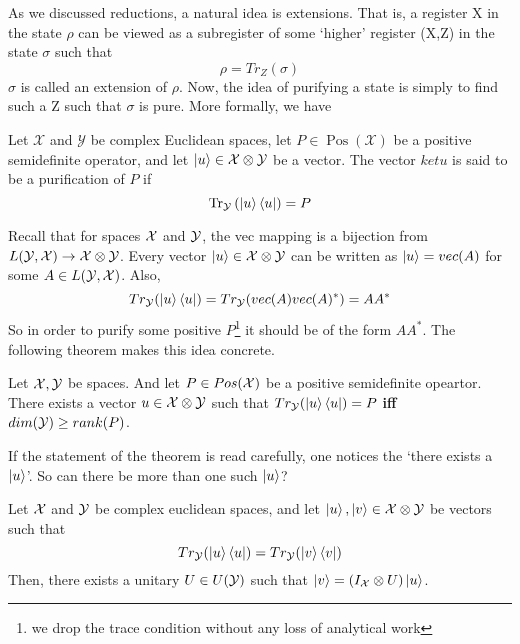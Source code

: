 \noindent
As we discussed reductions, a natural idea is extensions. That is, a register \textsf{X} in the state $\rho$ can be viewed as a subregister of some `higher' register (\textsf{X},\textsf{Z}) in the state $\sigma$ such that
\[\rho = Tr_Z(\sigma)\]
$\sigma$ is called an extension of $\rho$. Now, the idea of purifying a state is simply to find such a \textsf{Z}  such that $\sigma$ is pure. More formally, we have
\begin{definition}[Purification]
Let $\mathcal{X}$ and $\mathcal{Y}$ be complex Euclidean spaces, let $P \in \operatorname{Pos}(\mathcal{X})$ be a positive semidefinite operator, and let $\ket{u} \in \mathcal{X} \otimes \mathcal{Y}$ be a vector. The vector $ket{u}$ is said to be a purification of $P$ if
$$
\operatorname{Tr}_{\mathcal{Y}}\left(\ket{u}\bra{u}\right)=P
$$
\end{definition}
\noindent
Recall that for spaces $\mathcal{X}$ and $\mathcal{Y}$, the vec mapping is a bijection from $L(\mathcal{Y},\mathcal{X}) \to \mathcal{X}\otimes\mathcal{Y}$. Every vector $\ket{u}\in \mathcal{X}\otimes\mathcal{Y}$ can be written as $\ket{u} = vec(A)$ for some $A \in L(\mathcal{Y},\mathcal{X})$. Also,
\[Tr_{\mathcal{Y}}(\ket{u}\bra{u}) = Tr_{\mathcal{Y}}(vec(A)vec(A)^*) = AA^*\]
So in order to purify some positive $P$\footnote{we drop the trace condition without any loss of analytical work} it should be of the form $AA^*$. The following theorem makes this idea concrete.
\begin{theorem}
Let $\mathcal{X},\mathcal{Y}$ be spaces. And let $P \in Pos(\mathcal{X})$ be a positive semidefinite opeartor. There exists a vector $u \in \mathcal{X}\otimes\mathcal{Y}$ such that $Tr_{\mathcal{Y}}(\ket{u}\bra{u}) = P$ \textbf{iff} $dim(\mathcal{Y}) \geq rank(P)$.
\end{theorem}\noindent 
If the statement of the theorem is read carefully, one notices the `there exists a $\ket{u}$'. So can there be more than one such $\ket{u}$? 
\begin{theorem}
Let $\mathcal{X}$ and $\mathcal{Y}$ be complex euclidean spaces, and let $\ket{u},\ket{v}\in\mathcal{X}\otimes\mathcal{Y}$ be vectors such that
\[Tr_{\mathcal{Y}}(\ket{u}\bra{u}) = Tr_{\mathcal{Y}}(\ket{v}\bra{v})\]
Then, there exists a unitary $U\in U(\mathcal{Y})$ such that $\ket{v} = (I_{\mathcal{X}}\otimes U)\ket{u}$.

\end{theorem}